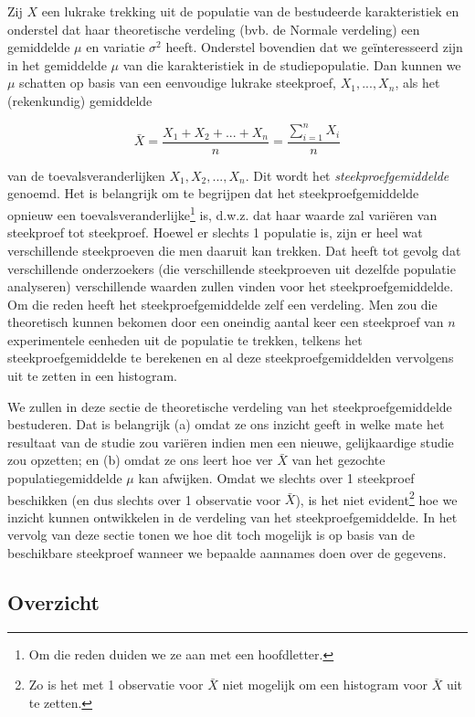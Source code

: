 \documentclass[
  12pt,dutch]{book}
\theoremstyle{definition}
\theoremstyle{definition}
\theoremstyle{definition}
\theoremstyle{definition}
\theoremstyle{remark}
\begin{document}
Zij \(X\) een lukrake trekking uit de populatie van de bestudeerde karakteristiek en onderstel dat haar theoretische verdeling (bvb. de Normale verdeling) een gemiddelde \(\mu\) en variatie \(\sigma^2\) heeft.
Onderstel bovendien dat we geïnteresseerd zijn in het gemiddelde \(\mu\) van die karakteristiek in de studiepopulatie.
Dan kunnen we \(\mu\) schatten op basis van een eenvoudige lukrake steekproef, \(X_1,...,X_n\), als het (rekenkundig) gemiddelde

\begin{equation*}
\bar X = \frac{X_1+ X_2+ ... + X_n}{n} = \frac{\sum_{i=1}^{n} X_i}{n}
\end{equation*}

van de toevalsveranderlijken \(X_1,X_2, ..., X_n\).
Dit wordt het \emph{steekproefgemiddelde} genoemd.
Het is belangrijk om te begrijpen dat het
steekproefgemiddelde opnieuw een toevalsveranderlijke\footnote{Om die reden duiden we ze aan met een hoofdletter.} is, d.w.z. dat haar
waarde zal variëren van steekproef tot steekproef. Hoewel er
slechts 1 populatie is, zijn er heel wat verschillende steekproeven die men
daaruit kan trekken. Dat heeft tot gevolg dat verschillende onderzoekers
(die verschillende steekproeven uit dezelfde populatie analyseren)
verschillende waarden zullen vinden voor het steekproefgemiddelde. Om die
reden heeft het steekproefgemiddelde zelf een verdeling.
Men zou die theoretisch kunnen bekomen door een oneindig aantal keer een steekproef van \(n\) experimentele eenheden uit de populatie te trekken, telkens het steekproefgemiddelde te berekenen en al deze steekproefgemiddelden vervolgens uit te zetten in een histogram.

We zullen in deze sectie de theoretische verdeling van het steekproefgemiddelde bestuderen.
Dat is belangrijk (a) omdat ze ons inzicht geeft in welke mate het resultaat van de studie zou variëren indien men een nieuwe, gelijkaardige studie zou opzetten; en (b) omdat ze ons leert hoe ver \(\bar X\) van het gezochte populatiegemiddelde \(\mu\) kan afwijken.
Omdat we slechts over 1 steekproef beschikken (en dus slechts over 1 observatie voor \(\bar X\)), is het niet evident\footnote{Zo is het met 1 observatie voor \(\bar X\) niet mogelijk om een histogram voor \(\bar X\) uit te zetten.} hoe we inzicht
kunnen ontwikkelen in de verdeling van het steekproefgemiddelde.
In het vervolg van deze sectie tonen we hoe dit toch mogelijk is op basis van de
beschikbare steekproef wanneer we bepaalde aannames doen over de gegevens.

\subsection{Overzicht}\label{overzicht}
\end{document}
